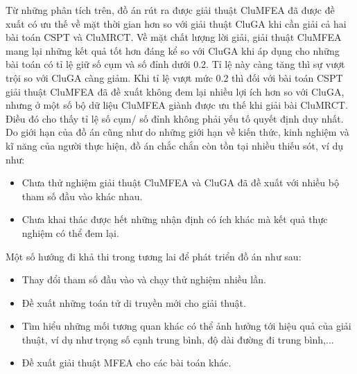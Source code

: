 Từ những phân tích trên, đồ án rút ra được giải thuật CluMFEA đã được đề xuất có ưu thế về mặt thời gian hơn so với giải thuật CluGA khi cần giải cả hai bài toán CSPT và CluMRCT. Về mặt chất lượng lời giải, giải thuật CluMFEA mang lại những kết quả tốt hơn đáng kể so với CluGA khi áp dụng cho những bài toán có tỉ lệ giữ số cụm và số đỉnh dưới 0.2. Tỉ lệ này càng tăng thì sự vượt trội so với CluGA càng giảm. Khi tỉ lệ vượt mức 0.2 thì đối với bài toán CSPT giải thuật CluMFEA đã đề xuất không đem lại nhiều lợi ích hơn so với CluGA, nhưng ở một số bộ dữ liệu CluMFEA giành được ưu thế khi giải bài CluMRCT. Điều đó cho thấy tỉ lệ số cụm/ số đỉnh không phải yếu tố quyết định duy nhất.
Do giới hạn của đồ án cũng như do những giới hạn về kiến thức, kinh nghiệm và kĩ năng của người thực hiện, đồ án chắc chắn còn tồn tại nhiều thiếu sót, ví dụ như:

\begin{itemize}
	\item Chưa thử nghiệm giải thuật CluMFEA và CluGA đã đề xuất với nhiều bộ tham số đầu vào khác nhau.
	\item Chưa khai thác được hết những nhận định có ích khác mà kết quả thực nghiệm có thể đem lại.
\end{itemize}
Một số hướng đi khả thi trong tương lai để phát triển đồ án như sau:
\begin{itemize}
	\item Thay đổi tham số đầu vào và chạy thử nghiệm nhiều lần.
	\item Đề xuất những toán tử di truyền mới cho giải thuật.
	\item Tìm hiểu những mối tương quan khác có thể ảnh hưởng tới hiệu quả của giải thuật, ví dụ như trọng số cạnh trung bình, độ dài đường đi trung bình,...
	\item Đề xuất giải thuật MFEA cho các bài toán khác.
\end{itemize}

